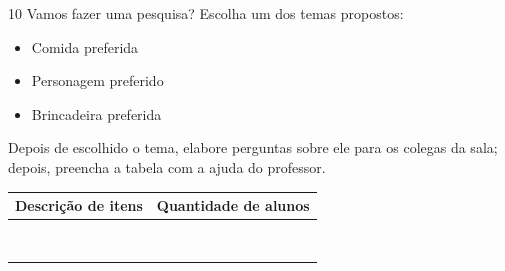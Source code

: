 
\num{10} Vamos fazer uma pesquisa? Escolha um dos temas propostos:

\begin{itemize}
\item
  Comida preferida
\item
  Personagem preferido
\item
  Brincadeira preferida
\end{itemize}

Depois de escolhido o tema, elabore perguntas sobre ele para os colegas da sala; depois,
preencha a tabela com a ajuda do professor.

\begin{table}[H]
\centering
\begin{tabular}{|c|c|}
\hline
\textbf{Descrição de itens} & \textbf{Quantidade de alunos} \\ \hline
                            &                               \\ \hline
                            &                               \\ \hline
                            &                               \\ \hline
                            &                               \\ \hline
                            &                               \\ \hline
                            &                               \\ \hline
                            &                               \\ \hline
                            &                               \\ \hline
\end{tabular}
\end{table}




